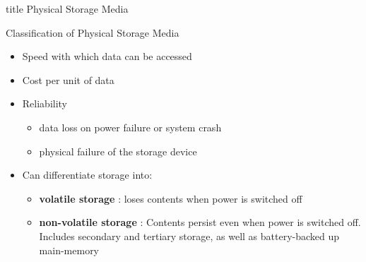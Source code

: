 \documentclass[aspectratio=169, xcolor=dvipsnames]{beamer}
\begin{document}
\begin{frame}
  \vfill
  \centering
  \begin{beamercolorbox}[sep=8pt,center,shadow=true,rounded=true]{title}
    Physical Storage Media\par%
  \end{beamercolorbox}
  \vfill
\end{frame}

\begin{frame}{Classification of Physical Storage Media}
    \begin{block}{}
        \begin{itemize}[<+->]
            \item Speed with which data can be accessed
            \item Cost per unit of data
            \item Reliability
            \begin{itemize}[<+->]
                \item data loss on power failure or system crash
                \item physical failure of the storage device
            \end{itemize}
            \item Can differentiate storage into:
            \begin{itemize}[<+->]
                \item \textbf{volatile storage} : loses contents when power is switched off
                \item \textbf{non-volatile storage} : Contents persist even when power is switched off. Includes secondary and tertiary storage, as well as battery-backed up main-memory
            \end{itemize}
        \end{itemize}
    \end{block}
\end{frame}
\end{document}
